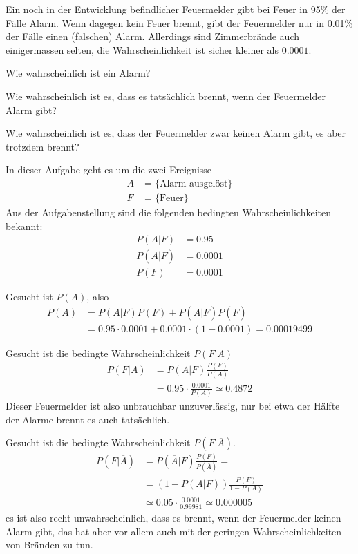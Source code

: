 Ein noch in der Entwicklung befindlicher Feuermelder gibt bei Feuer in 95\%
der Fälle Alarm. Wenn dagegen kein Feuer brennt, gibt der Feuermelder
nur in 0.01\% der Fälle einen (falschen) Alarm. Allerdings sind
Zimmerbrände auch einigermassen selten, die Wahrscheinlichkeit
ist sicher kleiner als $0.0001$.

\begin{teilaufgaben}
\item Wie wahrscheinlich ist ein Alarm?
\item Wie wahrscheinlich ist es, dass es tatsächlich brennt, wenn
der Feuermelder Alarm gibt?
\item Wie wahrscheinlich ist es, dass der Feuermelder zwar keinen
Alarm gibt, es aber trotzdem brennt?
\end{teilaufgaben}

\begin{loesung}
In dieser Aufgabe geht es um die zwei Ereignisse
\begin{align*}
A&=\{\text{Alarm ausgelöst}\}
\\
F&=\{\text{Feuer}\}
\end{align*}
Aus der Aufgabenstellung sind die folgenden bedingten Wahrscheinlichkeiten
bekannt:
\begin{align*}
P(A|F)&=0.95
\\
P(A|\overline F)&=0.0001
\\
P(F)&=0.0001
\end{align*}
\begin{teilaufgaben}
\item Gesucht ist $P(A)$, also
\begin{align*}
P(A)&=P(A|F)P(F)+P(A|\overline F)P(\overline F)
\\
&=0.95\cdot 0.0001+0.0001\cdot(1-0.0001)= 0.00019499
\end{align*}
\item
Gesucht ist die bedingte Wahrscheinlichkeit $P(F|A)$
\begin{align*}
P(F|A)
&=
P(A|F) \frac{P(F)}{P(A)}
\\
&=0.95\cdot\frac{0.0001}{P(A)}\simeq0.4872
\end{align*}
Dieser Feuermelder ist also unbrauchbar unzuverlässig, nur bei etwa der
Hälfte der Alarme brennt es auch tatsächlich.
\item Gesucht ist die bedingte Wahrscheinlichkeit $P(F|\overline A)$.
\begin{align*}
P(F|\overline A)
&=
P(\overline A|F)\frac{P(F)}{P(\overline A)}=
\\
&=
(1-P(A|F))\frac{P(F)}{1-P(A)}
\\
&\simeq
0.05\cdot \frac{0.0001}{0.99981}
\simeq
0.000005
\end{align*}
es ist also recht unwahrscheinlich, dass es brennt,
wenn der Feuermelder keinen Alarm gibt, das hat aber vor allem auch
mit der geringen Wahrscheinlichkeiten von Bränden zu tun.
\qedhere
\end{teilaufgaben}
\end{loesung}

